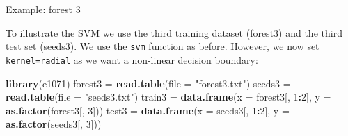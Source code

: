 \documentclass[ignorenonframetext,]{beamer}
\newenvironment{Shaded}{\begin{snugshade}}{\end{snugshade}}
\newcommand{\KeywordTok}[1]{\textcolor[rgb]{0.13,0.29,0.53}{\textbf{#1}}}
\newcommand{\DataTypeTok}[1]{\textcolor[rgb]{0.13,0.29,0.53}{#1}}
\newcommand{\DecValTok}[1]{\textcolor[rgb]{0.00,0.00,0.81}{#1}}
\newcommand{\StringTok}[1]{\textcolor[rgb]{0.31,0.60,0.02}{#1}}
\newcommand{\OperatorTok}[1]{\textcolor[rgb]{0.81,0.36,0.00}{\textbf{#1}}}
\newcommand{\NormalTok}[1]{#1}
\begin{document}
\begin{frame}[fragile]

\begin{block}{Example: forest 3}

To illustrate the SVM we use the third training dataset (forest3) and
the third test set (seeds3). We use the \texttt{svm} function as before.
However, we now set
\texttt{kernel=\textquotesingle{}radial\textquotesingle{}} as we want a
non-linear decision boundary:

\end{block}

\end{frame}

\begin{frame}[fragile]

\footnotesize

\begin{Shaded}
\begin{Highlighting}[]
\KeywordTok{library}\NormalTok{(e1071)}
\NormalTok{forest3 =}\StringTok{ }\KeywordTok{read.table}\NormalTok{(}\DataTypeTok{file =} \StringTok{"forest3.txt"}\NormalTok{)}
\NormalTok{seeds3 =}\StringTok{ }\KeywordTok{read.table}\NormalTok{(}\DataTypeTok{file =} \StringTok{"seeds3.txt"}\NormalTok{)}
\NormalTok{train3 =}\StringTok{ }\KeywordTok{data.frame}\NormalTok{(}\DataTypeTok{x =}\NormalTok{ forest3[, }\DecValTok{1}\OperatorTok{:}\DecValTok{2}\NormalTok{], }\DataTypeTok{y =} \KeywordTok{as.factor}\NormalTok{(forest3[, }\DecValTok{3}\NormalTok{]))}
\NormalTok{test3 =}\StringTok{ }\KeywordTok{data.frame}\NormalTok{(}\DataTypeTok{x =}\NormalTok{ seeds3[, }\DecValTok{1}\OperatorTok{:}\DecValTok{2}\NormalTok{], }\DataTypeTok{y =} \KeywordTok{as.factor}\NormalTok{(seeds3[, }\DecValTok{3}\NormalTok{]))}
\end{Highlighting}
\end{Shaded}

\end{frame}
\end{document}
